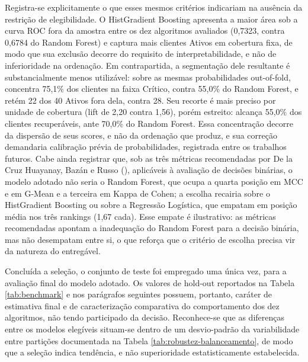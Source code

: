 Registra-se explicitamente o que esses mesmos critérios indicariam na ausência da restrição de elegibilidade. O HistGradient Boosting apresenta a maior área sob a curva ROC fora da amostra entre os dez algoritmos avaliados (0,7323, contra 0,6784 do Random Forest) e captura mais clientes Ativos em cobertura fixa, de modo que sua exclusão decorre do requisito de interpretabilidade, e não de inferioridade na ordenação. Em contrapartida, a segmentação dele resultante é substancialmente menos utilizável: sobre as mesmas probabilidades out-of-fold, concentra 75,1\% dos clientes na faixa Crítico, contra 55,0\% do Random Forest, e retém 22 dos 40 Ativos fora dela, contra 28. Seu recorte é mais preciso por unidade de cobertura (lift de 2,20 contra 1,56), porém estreito: alcança 55,0\% dos clientes recuperáveis, ante 70,0\% do Random Forest. Essa concentração decorre da dispersão de seus scores, e não da ordenação que produz, e sua correção demandaria calibração prévia de probabilidades, registrada entre os trabalhos futuros. Cabe ainda registrar que, sob as três métricas recomendadas por De la Cruz Huayanay, Bazán e Russo (\citeyear{delacruz2025}), aplicáveis à avaliação de decisões binárias, o modelo adotado não seria o Random Forest, que ocupa a quarta posição em MCC e em G-Mean e a terceira em Kappa de Cohen; a escolha recairia sobre o HistGradient Boosting ou sobre a Regressão Logística, que empatam em posição média nos três rankings (1,67 cada). Esse empate é ilustrativo: as métricas recomendadas apontam a inadequação do Random Forest para a decisão binária, mas não desempatam entre si, o que reforça que o critério de escolha precisa vir da natureza do entregável.

Concluída a seleção, o conjunto de teste foi empregado uma única vez, para a avaliação final do modelo adotado. Os valores de hold-out reportados na Tabela \ref{tab:benchmark} e nos parágrafos seguintes possuem, portanto, caráter de estimativa final e de caracterização comparativa do comportamento dos dez algoritmos, não tendo participado da decisão. Reconhece-se que as diferenças entre os modelos elegíveis situam-se dentro de um desvio-padrão da variabilidade entre partições documentada na Tabela \ref{tab:robustez-balanceamento}, de modo que a seleção indica tendência, e não superioridade estatisticamente estabelecida.

